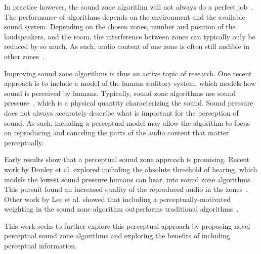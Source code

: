 In practice however, the sound zone algorithm will not always do a perfect job~\cite{moller2016sound}.
The performance of algorithms depends on the environment and the available sound system.
Depending on the chosen zones, number and position of the loudspeakers, and the room, the interference between zones can typically only be reduced by so much.
As such, audio content of one zone is often still audible in other zones~\cite{moller2016sound}.

Improving sound zone algorithms is thus an active topic of research.
One recent approach is to include a model of the human auditory system, which models how sound is perceived by humans.
Typically, sound zone algorithms use sound pressure~\cite{betlehem2015personal}, which is a physical quantity characterizing the sound.
Sound pressure does not always accurately describe what is important for the perception of sound.
As such, including a perceptual model may allow the algorithm to focus on reproducing and canceling the parts of the audio content
that matter perceptually.

Early results show that a perceptual sound zone approach is promising.
Recent work by Donley et al. explored including the absolute threshold of hearing, which models the lowest sound pressure
humans can hear, into sound zone algorithms.
This pursuit found an increased quality of the reproduced audio in the zones~\cite{donley2015multizone}.
Other work by Lee et al. showed that including a perceptually-motivated weighting in the sound zone algorithm outperforms 
traditional algorithms~\cite{lee2019towards,lee2020signal}.

This work seeks to further explore this perceptual approach by proposing novel perceptual sound zone algorithms and exploring
the benefits of including perceptual information.

